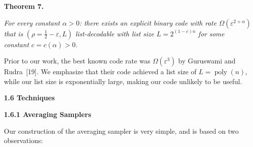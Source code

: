 

\par\medskip\noindent\textbf{
\textbf{Theorem 7}\textbf{.}
}\par



\emph{For every constant $\alpha>0$: there exists an explicit binary code with rate $\Omega(\varepsilon^{2+\alpha})$ that is $(\rho=\frac{1}{2}-\varepsilon,L)$ list-decodable with list size $L=2^{(1-c)n}$ for some constant $c=c(\alpha)>0$.}\par






Prior to our work, the best known code rate was $\Omega(\varepsilon^{3})$ by Guruswami and Rudra [19]. We emphasize that their code achieved a list size of $L=\operatorname*{poly}(n)$, while our list size is exponentially large, making our code unlikely to be useful.\par





\par\medskip\noindent\textbf{
1.6 Techniques}\par




\par\medskip\noindent\textbf{
1.6.1 Averaging Samplers}\par




Our construction of the averaging sampler is very simple, and is based on two observations:\par




